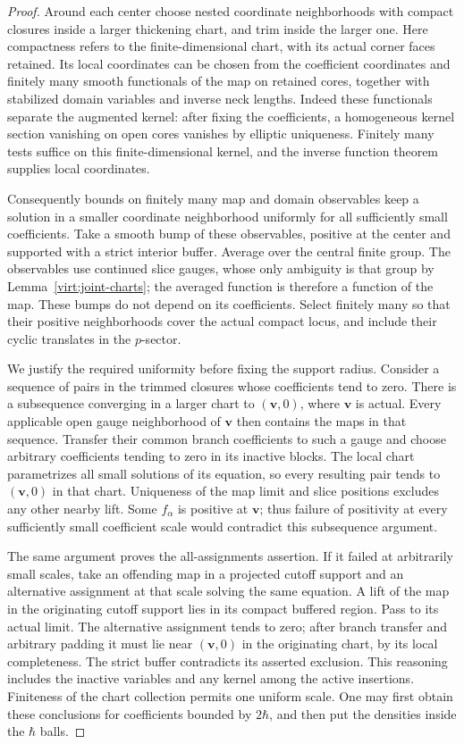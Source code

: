 \documentclass[11pt]{article}
\theoremstyle{definition}
\theoremstyle{remark}
\numberwithin{equation}{section}
\begin{document}
\begin{proof}
Around each center choose nested coordinate neighborhoods with compact
closures inside a larger thickening chart, and trim inside the larger
one.  Here compactness refers to the finite-dimensional chart, with its
actual corner faces retained.  Its local coordinates can be chosen from
the coefficient coordinates and finitely many smooth functionals of the
map on retained cores, together with stabilized domain variables and
inverse neck lengths.  Indeed these functionals separate the augmented
kernel: after fixing the coefficients, a homogeneous kernel section
vanishing on open cores vanishes by elliptic uniqueness.  Finitely many
tests suffice on this finite-dimensional kernel, and the inverse
function theorem supplies local coordinates.

Consequently bounds on finitely many map and domain observables keep a
solution in a smaller coordinate neighborhood uniformly for all
sufficiently small coefficients.  Take a smooth bump of these
observables, positive at the center and supported with a strict interior
buffer.  Average over the central finite group.  The observables use
continued slice gauges, whose only ambiguity is that group by
Lemma~\ref{virt:joint-charts}; the averaged function is therefore a
function of the map.  These bumps do not depend on its coefficients.
Select finitely many so that their positive neighborhoods cover the
actual compact locus, and include their cyclic translates in the
$p$-sector.

We justify the required uniformity before fixing the support radius.
Consider a sequence of pairs in the trimmed closures whose coefficients
tend to zero.  There is a subsequence converging in a larger chart to
$(\mathbf v,0)$, where $\mathbf v$ is actual.  Every applicable open
gauge neighborhood of $\mathbf v$ then contains the maps in that
sequence.  Transfer their common branch coefficients to such a gauge
and choose arbitrary coefficients tending to zero in its inactive
blocks.  The local chart parametrizes all small solutions of its
equation, so every resulting pair tends to $(\mathbf v,0)$ in that chart.
Uniqueness of the map limit and slice positions excludes any other
nearby lift.  Some $f_\alpha$ is positive at $\mathbf v$; thus failure
of positivity at every sufficiently small coefficient scale would
contradict this subsequence argument.

The same argument proves the all-assignments assertion.  If it failed
at arbitrarily small scales, take an offending map in a projected cutoff
support and an alternative assignment at that scale solving the same
equation.  A lift of the map in the originating cutoff support lies in
its compact buffered region.  Pass to its actual limit.  The alternative
assignment tends to zero; after branch transfer and arbitrary padding
it must lie near $(\mathbf v,0)$ in the originating chart, by its local
completeness.  The strict buffer contradicts its asserted exclusion.
This reasoning includes the inactive variables and any kernel among
the active insertions.  Finiteness of the chart collection permits one
uniform scale.  One may first obtain these conclusions for coefficients
bounded by $2\hbar$, and then put the densities inside the $\hbar$ balls.


\end{proof}
\end{document}
